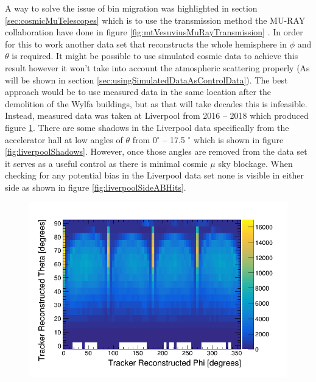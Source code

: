 A way to solve the issue of bin migration was highlighted in section \ref{sec:cosmicMuTelescopes} which is to use the transmission method the MU-RAY collaboration have done in figure \ref{fig:mtVesuviusMuRayTransmission} \cite{Ambrosino_2014}. In order for this to work  another data set that reconstructs the whole hemisphere in $\phi$ and $\theta$ is required. It might be possible to use simulated cosmic data to achieve this result however it won't take into account the atmospheric scattering properly (As will be shown in section \ref{sec:usingSimulatedDataAsControlData}). The best approach would be to use measured data in the same location after the demolition of the Wylfa buildings, but as that will take decades this is infeasible. Instead, measured data was taken at Liverpool from 2016 -- 2018 which produced figure \ref{fig:pVsTLiverpoolReversed}. There are some shadows in the Liverpool data specifically from the accelerator hall at low angles of $\theta$ from 0$^\circ$ -- 17.5 $^\circ$ which is shown in figure \ref{fig:liverpoolShadows}. However, once those angles are removed from the data set it serves as a useful control as there is minimal cosmic $\mu$ sky blockage. When checking for any potential bias in the Liverpool data set none is visible in either side as shown in figure \ref{fig:liverpoolSideABHits}. 

\begin{figure}[htbp]
 \centering
 \includegraphics[width=0.7\linewidth]{Chapter5/Figs/Raster/pVsTLiverpoolReversed.png}
 \label{fig:pVsTLiverpoolReversed}
\end{figure}

